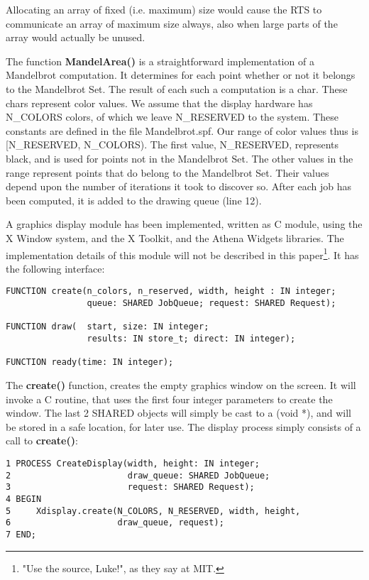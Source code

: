 Allocating an array of fixed (i.e. maximum) size would cause the RTS to
communicate an array of maximum size always, also when large parts of 
the array would actually be unused. 

The function {\bf MandelArea()} is a straightforward implementation of a 
Mandelbrot computation. It determines for each point whether or not it belongs
to the Mandelbrot Set. The result of each such a computation is a char.
These chars represent color values. We assume that the display hardware
has N\_COLORS colors, of which we leave N\_RESERVED to the system. These 
constants are defined in the file Mandelbrot.spf. Our range of color values 
thus is [N\_RESERVED, N\_COLORS). The first value, N\_RESERVED, represents 
black, and is used for points not in the Mandelbrot Set. The other
values in the range represent points that do belong to the Mandelbrot
Set. Their values depend upon the number of iterations it took
to discover so.
\Skip
After each job has been computed, it is added to the drawing queue (line 12).


\newpage
{} \label{label:display}

A graphics display module has been implemented, written as C module, using 
the X Window system, and the X Toolkit, and the Athena Widgets libraries.
The implementation details of this module will not be described in this 
paper\footnote{"Use the source, Luke!", as they say at MIT.}. It has 
the following interface:
\begin{verbatim}
FUNCTION create(n_colors, n_reserved, width, height : IN integer;
                queue: SHARED JobQueue; request: SHARED Request);

FUNCTION draw(  start, size: IN integer; 
                results: IN store_t; direct: IN integer);

FUNCTION ready(time: IN integer);
\end{verbatim}




The {\bf create()} function, creates the empty graphics window on the screen.
It will invoke a C routine, that uses the first four integer parameters to 
create the window. The last 2 SHARED objects will simply be cast to a (void *),
and will be stored in a safe location, for later use. 
\Skip
The display process simply consists of a call to {\bf create()}:
\begin{verbatim}
1 PROCESS CreateDisplay(width, height: IN integer;
2                       draw_queue: SHARED JobQueue;
3                       request: SHARED Request);
4 BEGIN
5     Xdisplay.create(N_COLORS, N_RESERVED, width, height, 
6                     draw_queue, request);
7 END;
\end{verbatim}


